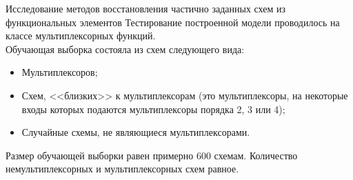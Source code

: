 \documentclass[serif,utf8]{beamer}
\begin{document}
\begin{frame}{Исследование методов восстановления частично заданных схем из функциональных элементов}
Тестирование построенной модели проводилось на классе мультиплексорных функций.\\
Обучающая выборка состояла из схем следующего вида:
\begin{itemize}
\item Мультиплексоров;
\item Схем, <<близких>> к мультиплексорам (это мультиплексоры, на некоторые входы которых подаются мультиплексоры порядка 2, 3 или 4);
\item Случайные схемы, не являющиеся мультиплексорами.
\end{itemize}
Размер обучающей выборки равен примерно 600 схемам. Количество немультиплексорных и мультиплексорных схем равное.\par
\end{frame}

\end{document}
